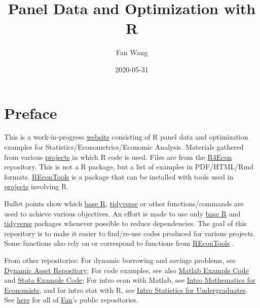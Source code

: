 \documentclass[
]{book}
\title{Panel Data and Optimization with R}
\author{Fan Wang}
\date{2020-05-31}
\begin{document}
\maketitle

{
\hypersetup{linkcolor=}
\setcounter{tocdepth}{1}
\tableofcontents
}
\hypertarget{preface}{%
\chapter*{Preface}\label{preface}}

This is a work-in-progress \href{https://fanwangecon.github.io/R4Econ/}{website} consisting of R panel data and optimization examples for Statistics/Econometrics/Economic Analysis. Materials gathered from various \href{https://fanwangecon.github.io/research}{projects} in which R code is used. Files are from the \href{https://github.com/FanWangEcon/R4Econ}{R4Econ} repository. This is not a R package, but a list of examples in PDF/HTML/Rmd formats. \href{https://fanwangecon.github.io/REconTools/}{REconTools} is a package that can be installed with tools used in \href{https://fanwangecon.github.io/research}{projects} involving R.

Bullet points show which \href{https://www.rdocumentation.org/packages/base/versions/3.5.2}{base R}, \href{https://www.tidyverse.org/}{tidyverse} or other functions/commands are used to achieve various objectives. An effort is made to use only \href{https://www.rdocumentation.org/packages/base/versions/3.5.2}{base R} \citep{R-base} and \href{https://www.tidyverse.org/}{tidyverse} \citep{R-tidyverse} packages whenever possible to reduce dependencies. The goal of this repository is to make it easier to find/re-use codes produced for various projects. Some functions also rely on or correspond to functions from \href{https://fanwangecon.github.io/REconTools/}{REconTools} \citep{R-REconTools}.

From other repositories: For dynamic borrowing and savings problems, see \href{https://fanwangecon.github.io/CodeDynaAsset/}{Dynamic Asset Repository}; For code examples, see also \href{https://fanwangecon.github.io/M4Econ/}{Matlab Example Code} and \href{https://fanwangecon.github.io/Stata4Econ/}{Stata Example Code}; For intro econ with Matlab, see \href{https://fanwangecon.github.io/Math4Econ/}{Intro Mathematics for Economists}, and for intro stat with R, see \href{https://fanwangecon.github.io/Stat4Econ/}{Intro Statistics for Undergraduates}. See \href{https://github.com/FanWangEcon}{here} for all of \href{https://fanwangecon.github.io/}{Fan}'s public repositories.
\end{document}
